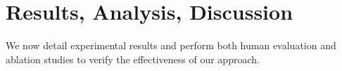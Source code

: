 \documentclass[11pt]{article}
\begin{document}
\section{Results, Analysis, Discussion}

We now detail experimental results and perform both human evaluation and ablation studies to verify the effectiveness of our approach. 


\end{document}
